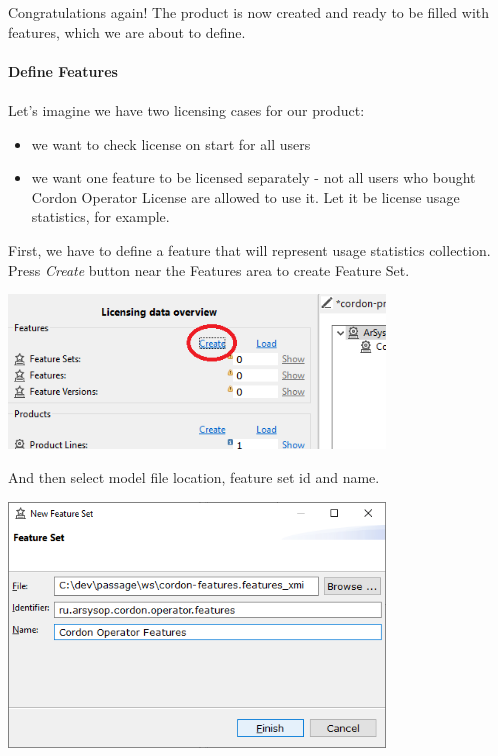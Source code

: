 \documentclass[12pt]{report}
\begin{document}
Congratulations again! The product is now created and ready to be filled with features, which we are about to define. 

\paragraph*{Define Features}
\paragraph*{}

Let's imagine we have two licensing cases for our product:
\begin{itemize}
    \item we want to check license on start for all users
    \item we want one feature to be licensed separately - not all users who bought Cordon Operator License are allowed to use it. Let it be license usage statistics, for example.
\end{itemize}

First, we have to define a feature that will represent usage statistics collection. Press \textit{Create} button near the Features area to create Feature Set.

\begin{center}
    \includegraphics[width=0.75\textwidth]{feature_set_create}
\end{center}

And then select model file location, feature set id and name.

\begin{center}
    \includegraphics[width=0.75\textwidth]{feature_set_dialog}
\end{center}
\end{document}
